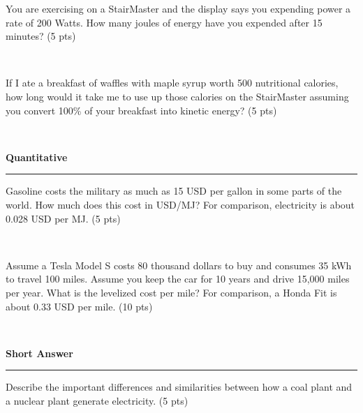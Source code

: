 \documentclass[12pt, oneside]{article}
\newif\ifsolution
\newcommand{\chead}[1]
{\begin{center}\large\textbf{#1}\end{center}
\hrule
\vspace{10pt}}
\newcommand{\solution}[1]
{\ifsolution
Answer: {\it #1}
\else\fi}
\begin{document}
You are exercising on a StairMaster and the display says you expending
power a rate of 200 Watts.  How many joules of energy have you expended
after 15 minutes? (5 pts)

\framebox[2.5in]{\rule{0cm}{1.5cm}}\\

\solution{
Energy equals power multiplied by time.

$$ 200W \cdot 15 min \cdot \frac{60 sec}{1 min} = 180 kJ $$
}


\vfill

If I ate a breakfast of waffles with maple syrup worth 500 nutritional
calories, how
long would it take me to use up those calories on the StairMaster
assuming you convert 100\% of your breakfast into kinetic energy? (5
pts)

\framebox[2.5in]{\rule{0cm}{1.5cm}}\\

\solution{
Here I assume that we are 100\% efficient in the conversion of food chemical
energy to kinetic energy.  Using energy equals power multiplied by time
and the rate of energy use we determined in c:

$$ 500 kcal = \frac{43 kcal}{15 min} \cdot X min $$
$$ X = 500 kcal \cdot  \frac{15 min}{43 kcal} = 174 min $$

Which is slightly less than 3 hours.
}

\vfill

\newpage
\chead{Quantitative}

Gasoline costs the military as much as 15 USD per gallon in some parts
of the world.  How much does this cost in USD/MJ?  For comparison,
electricity is about 0.028 USD per MJ. (5 pts)

\framebox[2.5in]{\rule{0cm}{1.5cm}}\\

\vfill

Assume a Tesla Model S costs 80 thousand dollars to buy and consumes 35
kWh to travel 100 miles.  Assume you keep the car for 10 years and drive
15,000 miles per year.  What is the levelized cost per mile? For
comparison, a Honda Fit is about 0.33 USD per mile.  (10 pts)

\framebox[2.5in]{\rule{0cm}{1.5cm}}\\


\vfill

\newpage
\chead{Short Answer}

Describe the important differences and similarities between how a coal
plant and a nuclear plant generate electricity. (5 pts)
\end{document}
